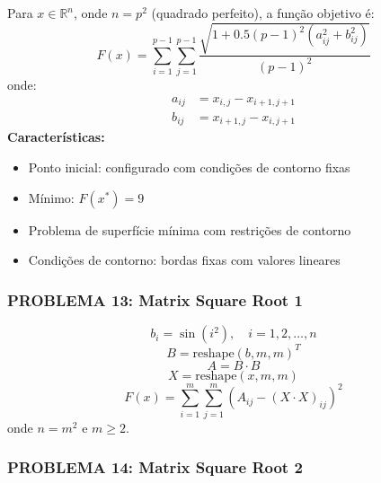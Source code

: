 \documentclass[12pt,a4paper]{article}
\begin{document}
Para $x \in \mathbb{R}^n$, onde $n = p^2$ (quadrado perfeito), a função objetivo é:
\begin{equation}
F(x) = \sum_{i=1}^{p-1} \sum_{j=1}^{p-1} \frac{\sqrt{1 + 0.5(p-1)^2(a_{ij}^2 + b_{ij}^2)}}{(p-1)^2}
\end{equation}
onde:
\begin{align}
a_{ij} &= x_{i,j} - x_{i+1,j+1} \\
b_{ij} &= x_{i+1,j} - x_{i,j+1}
\end{align}
\textbf{Características:}
\begin{itemize}
\item Ponto inicial: configurado com condições de contorno fixas
\item Mínimo: $F(x^*) = 9$
\item Problema de superfície mínima com restrições de contorno
\item Condições de contorno: bordas fixas com valores lineares
\end{itemize}


\subsubsection{\textbf{PROBLEMA 13: Matrix Square Root 1}}

\begin{equation}
b_i = \sin(i^2), \quad i = 1, 2, \ldots, n
\end{equation}
\begin{equation}
B = \text{reshape}(b, m, m)^T
\end{equation}
\begin{equation}
A = B \cdot B
\end{equation}
\begin{equation}
X = \text{reshape}(x, m, m)
\end{equation}
\begin{equation}
F(x) = \sum_{i=1}^{m} \sum_{j=1}^{m} (A_{ij} - (X \cdot X)_{ij})^2
\end{equation}
onde $n = m^2$ e $m \geq 2$.

\subsubsection{\textbf{PROBLEMA 14: Matrix Square Root 2}}
\end{document}
